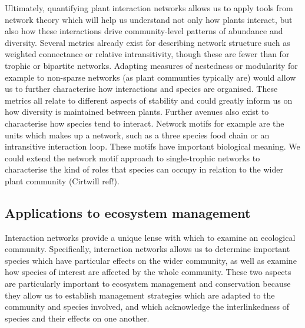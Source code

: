 \documentclass[a4,12pt]{article}
\begin{document}
        Ultimately, quantifying plant interaction networks allows us to apply tools from network theory which will help us understand not only how plants interact, but also how these interactions drive community-level patterns of abundance and diversity. Several metrics already exist for describing network structure such as weighted connectance or relative intransitivity, though these are fewer than for trophic or bipartite networks. Adapting measures of nestedness or modularity for example to non-sparse networks (as plant communties typically are) would allow us to further characterise how interactions and species are organised. These metrics all relate to different aspects of stability and could greatly inform us on how diversity is maintained between plants. 
        Further avenues also exist to characterise how species tend to interact. Network motifs for example are the units which makes up a network, such as a three species food chain or an intransitive interaction loop. These motifs have important biological meaning. We could extend the network motif approach to single-trophic networks to characterise the kind of roles that species can occupy in relation to the wider plant community (Cirtwill ref!).\\



    \subsection{Applications to ecosystem management}

        Interaction networks provide a unique lense with which to examine an ecological community. Specifically, interaction networks allows us to determine important species which have particular effects on the wider community, as well as examine how species of interest are affected by the whole community. These two aspects are particularly important to ecosystem management and conservation because they allow us to establish management strategies which are adapted to the community and species involved, and which acknowledge the interlinkedness of species and their effects on one another. \\
\end{document}
